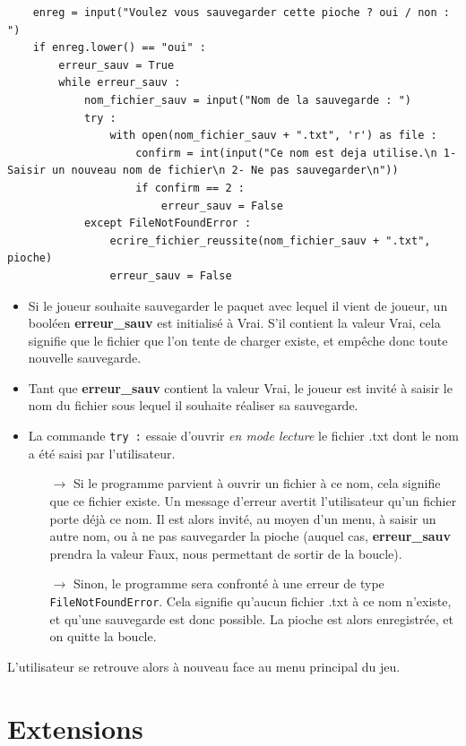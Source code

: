 \documentclass[titlepage]{article}
\begin{document}
	\begin{lstlisting}
	enreg = input("Voulez vous sauvegarder cette pioche ? oui / non : ")
	if enreg.lower() == "oui" :
		erreur_sauv = True
		while erreur_sauv :
			nom_fichier_sauv = input("Nom de la sauvegarde : ")
			try :
				with open(nom_fichier_sauv + ".txt", 'r') as file :
					confirm = int(input("Ce nom est deja utilise.\n 1- Saisir un nouveau nom de fichier\n 2- Ne pas sauvegarder\n"))
					if confirm == 2 :
						erreur_sauv = False
			except FileNotFoundError :
				ecrire_fichier_reussite(nom_fichier_sauv + ".txt", pioche)
				erreur_sauv = False
	\end{lstlisting}
	
	\begin{itemize}
	\item Si le joueur souhaite sauvegarder le paquet avec lequel il vient de joueur, un booléen \textbf{erreur\_sauv} est initialisé à Vrai. S'il contient la valeur Vrai, cela signifie que le fichier que l'on tente de charger existe, et empêche donc toute nouvelle sauvegarde. 
	\item Tant que \textbf{erreur\_sauv} contient la valeur Vrai, le joueur est invité à saisir le nom du fichier sous lequel il souhaite réaliser sa sauvegarde.
	\item La commande \texttt{try :} essaie d'ouvrir \emph{en mode lecture} le fichier .txt dont le nom a été saisi par l'utilisateur. 
		\begin{itemize}
		\item[$\rightarrow$] Si le programme parvient à ouvrir un fichier à ce nom, cela signifie que ce fichier existe. Un message d'erreur avertit l'utilisateur qu'un fichier porte déjà ce nom. Il est alors invité, au moyen d'un menu, à saisir un autre nom, ou à ne pas sauvegarder la pioche (auquel cas, \textbf{erreur\_sauv} prendra la valeur Faux, nous permettant de sortir de la boucle). 
		\item[$\rightarrow$] Sinon, le programme sera confronté à une erreur de type \texttt{FileNotFoundError}. Cela signifie qu'aucun fichier .txt à ce nom n'existe, et qu'une sauvegarde est donc possible. La pioche est alors enregistrée, et on quitte la boucle.
		\end{itemize}
	\end{itemize}
	\par
L'utilisateur se retrouve alors à nouveau face au menu principal du jeu.

\newpage \section{Extensions}
\label{sec : extensions}
\end{document}
